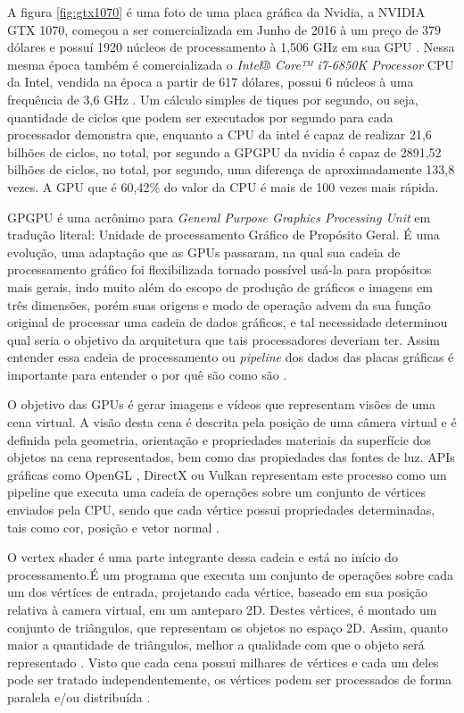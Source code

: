   A figura \ref{fig:gtx1070} é uma foto de uma placa gráfica da Nvidia, a NVIDIA GTX 1070, começou a ser comercializada em Junho de 2016 à um preço de 379 dólares e possuí 1920 núcleos de processamento à 1,506 GHz em sua GPU \citep{gtx1070:16}. Nessa mesma época também é comercializada o \textit{Intel® Core™ i7-6850K Processor} CPU da Intel, vendida na época a partir de 617 dólares, possui 6 núcleos à uma frequência de 3,6 GHz \citep{inteli7:16}. Um cálculo simples de tiques por segundo, ou seja, quantidade de ciclos que podem ser executados por segundo para cada processador demonstra que, enquanto a CPU da intel é capaz de realizar 21,6 bilhões de ciclos, no total, por segundo a GPGPU da nvidia é capaz de 2891,52 bilhões de ciclos, no total, por segundo, uma diferença de aproximadamente 133,8 vezes. A GPU que é 60,42\% do valor da CPU é mais de 100 vezes mais rápida.

  GPGPU é uma acrônimo para \textit{General Purpose Graphics Processing Unit} em tradução literal: Unidade de processamento Gráfico de Propósito Geral. É uma evolução, uma adaptação que as GPUs passaram, na qual sua cadeia de processamento gráfico foi flexibilizada tornado possível usá-la para propósitos mais gerais, indo muito além do escopo de produção de gráficos e imagens em três dimensões, porém suas origens e modo de operação advem da sua função original de processar uma cadeia de dados gráficos, e tal necessidade determinou qual seria o objetivo da arquitetura que tais processadores deveriam ter. Assim entender essa cadeia de processamento ou \textit{pipeline} dos dados das placas gráficas é importante para entender o por quê são como são \citep{massively:16}.

  O objetivo das GPUs é gerar imagens e vídeos que representam visões de uma cena virtual. A visão desta cena é descrita pela posição de uma câmera virtual e é definida pela geometria, orientação e propriedades materiais da superfície dos objetos na cena representados, bem como das propiedades das fontes de luz. APIs gráficas como OpenGL \citep{opengl}, DirectX \citep{directx} ou Vulkan\citep{vulkan} representam este processo como um pipeline que executa uma cadeia de operações sobre um conjunto de vértices enviados pela CPU, sendo que cada vértice possui propriedades determinadas, tais como cor, posição e vetor normal \citep{closer-look:08}.

  O vertex shader é uma parte integrante dessa cadeia e está no início do processamento.É um programa que executa um conjunto de operações sobre cada um dos vértíces de entrada, projetando cada vértice, baseado em sua posição relativa à camera virtual, em um amteparo 2D. Destes vértices, é montado um conjunto de triângulos, que representam os objetos no espaço 2D. Assim, quanto maior a quantidade de triângulos, melhor a qualidade com que o objeto será representado \citep{closer-look:08}. Visto que cada cena possui milhares de vértices e cada um deles pode ser tratado independentemente, os vértices podem ser processados de forma paralela e/ou distribuída \citep{gpu-comp:08}.

